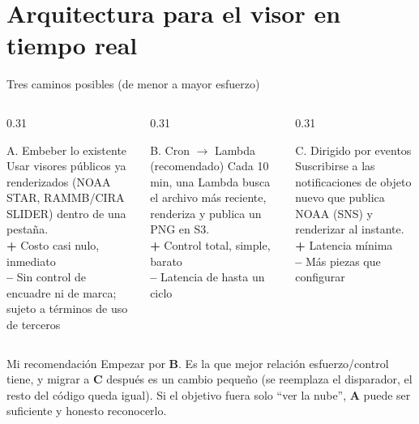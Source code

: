\documentclass[10pt,aspectratio=169]{beamer}
\begin{document}
\section{Arquitectura para el visor en tiempo real}

\begin{frame}{Tres caminos posibles (de menor a mayor esfuerzo)}
  \begin{columns}[T]
    \begin{column}{0.31\textwidth}
      \begin{block}{A. Embeber lo existente}
        \small
        Usar visores públicos ya renderizados (NOAA STAR, RAMMB/CIRA SLIDER)
        dentro de una pestaña.\\[0.3em]
        \textcolor{okgreen}{\textbf{+}} Costo casi nulo, inmediato\\
        \textcolor{warnred}{\textbf{--}} Sin control de encuadre ni de marca;
        sujeto a términos de uso de terceros
      \end{block}
    \end{column}
    \begin{column}{0.31\textwidth}
      \begin{block}{B. Cron $\to$ Lambda \textcolor{okgreen}{(recomendado)}}
        \small
        Cada 10 min, una Lambda busca el archivo más reciente, renderiza y
        publica un PNG en S3.\\[0.3em]
        \textcolor{okgreen}{\textbf{+}} Control total, simple, barato\\
        \textcolor{warnred}{\textbf{--}} Latencia de hasta un ciclo
      \end{block}
    \end{column}
    \begin{column}{0.31\textwidth}
      \begin{block}{C. Dirigido por eventos}
        \small
        Suscribirse a las notificaciones de objeto nuevo que publica NOAA
        (SNS) y renderizar al instante.\\[0.3em]
        \textcolor{okgreen}{\textbf{+}} Latencia mínima\\
        \textcolor{warnred}{\textbf{--}} Más piezas que configurar
      \end{block}
    \end{column}
  \end{columns}
  \vspace{0.5em}
  \begin{alertblock}{Mi recomendación}
    \small
    Empezar por \textbf{B}. Es la que mejor relación esfuerzo/control tiene, y
    migrar a \textbf{C} después es un cambio pequeño (se reemplaza el
    disparador, el resto del código queda igual). Si el objetivo fuera solo
    ``ver la nube'', \textbf{A} puede ser suficiente y honesto reconocerlo.
  \end{alertblock}
\end{frame}
\end{document}
